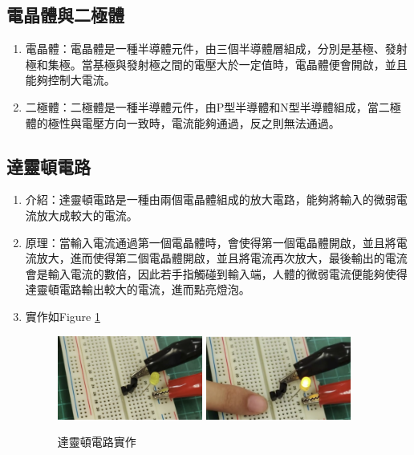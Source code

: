 \documentclass[12pt,a4paper]{article}
\begin{document}
\begin{CJK*}{UTF8}{bkai}
    \subsection{電晶體與二極體}
    \begin{enumerate}
        \item 電晶體：電晶體是一種半導體元件，由三個半導體層組成，分別是基極、發射極和集極。當基極與發射極之間的電壓大於一定值時，電晶體便會開啟，並且能夠控制大電流。
        \item 二極體：二極體是一種半導體元件，由P型半導體和N型半導體組成，當二極體的極性與電壓方向一致時，電流能夠通過，反之則無法通過。
    \end{enumerate}

    \subsection{達靈頓電路}
    \begin{enumerate}
        \item 介紹：達靈頓電路是一種由兩個電晶體組成的放大電路，能夠將輸入的微弱電流放大成較大的電流。
        \item 原理：當輸入電流通過第一個電晶體時，會使得第一個電晶體開啟，並且將電流放大，進而使得第二個電晶體開啟，並且將電流再次放大，最後輸出的電流會是輸入電流的數倍，因此若手指觸碰到輸入端，人體的微弱電流便能夠使得達靈頓電路輸出較大的電流，進而點亮燈泡。
        \item 實作如Figure \ref{fig:darlington}
              \begin{figure}[h]
                  \centering
                  \includegraphics[width=0.45\textwidth]{./images/darlington_1.png}
                  \includegraphics[width=0.45\textwidth]{./images/darlington_2.png}
                  \caption{達靈頓電路實作}
                  \label{fig:darlington}
              \end{figure}
    \end{enumerate}


\end{CJK*}
\end{document}
